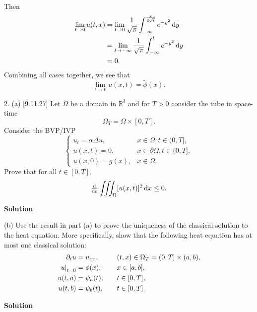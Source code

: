 \documentclass{article}
\begin{document}
Then
%
\begin{align*}
    \lim_{t \to 0} u(t, x)
        &= \lim_{t \to 0} \frac{1}{\sqrt{\pi}} \int_{-\infty}^{\frac{x}{2\sqrt{t}}} e^{-y^2} \dif y \\
        &= \lim_{l \to -\infty} \frac{1}{\sqrt{\pi}} \int_{-\infty}^{l} e^{-y^2} \dif y \\
        &= 0
        .
\end{align*}
%
Combining all cases together, we see that
%
\begin{equation*}
    \lim_{t \to 0} u(x, t) = \widetilde{\phi}(x)
    .
\end{equation*}

\newpage

2. (a) [9.11.27] Let $\Omega$ be a domain in $\mathbb{R}^3$ and for
$T > 0$ consider the tube in space-time
%
\begin{equation*}
    \Omega_T = \Omega \times [0, T]
    .
\end{equation*}
%
Consider the BVP/IVP
%
\begin{equation*}
    \begin{cases}
        u_t = \alpha \Delta u, & x \in \Omega, t \in (0, T], \\
        u(x, t) = 0, & x \in \partial \Omega, t \in (0, T], \\
        u(x, 0) = g(x), & x \in \Omega.
    \end{cases}
\end{equation*}
%
Prove that for all $t \in [0, T]$,
%
\begin{equation*}
    \od{}{t} \iiint_\Omega [u(x, t)]^2 \dif x \leq 0
    .
\end{equation*}

\textbf{Solution}

\vspace{5mm}

(b) Use the result in part (a) to prove the uniqueness of the classical
solution to the heat equation. More specifically, show that the
following heat equation has at most one classical solution:
%
\begin{alignat*}{2}
    \partial_t u &= u_{x x}, &&\quad (t, x) \in \Omega_T = (0, T] \times (a, b), \\
    \eval[0]{u}_{t = 0} &= \phi(x), &&\quad x \in [a, b], \\
    u(t, a) &= \psi_a(t), &&\quad t \in [0, T], \\
    u(t, b) &= \psi_b(t), &&\quad t \in [0, T].
\end{alignat*}

\textbf{Solution}
\end{document}
